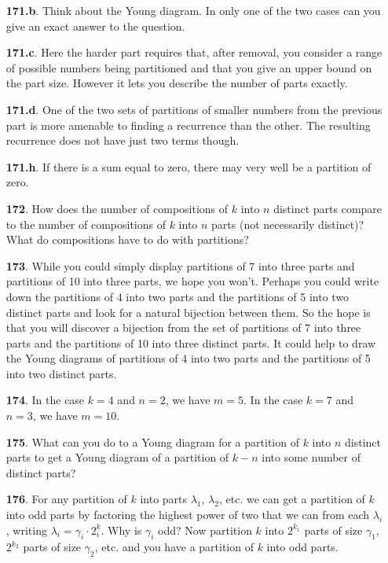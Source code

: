 \documentclass[10pt,]{book}
\theoremstyle{plain}
\theoremstyle{definition}
\theoremstyle{definition}
\numberwithin{equation}{chapter}
\begin{document}
\begin{itemize}[itemsep=1em]
\item[\textbf{171.b}.]Think about the Young diagram. In only one of the two cases can you give an exact answer to the question.%

\item[\textbf{171.c}.]Here the harder part requires that, after removal, you consider a range of possible numbers being partitioned and that you give an upper bound on the part size. However it lets you describe the number of parts exactly.%

\item[\textbf{171.d}.]One of the two sets of partitions of smaller numbers from the previous part is more amenable to finding a recurrence than the other. The resulting recurrence does not have just two terms though.%

\item[\textbf{171.h}.]If there is a sum equal to zero, there may very well be a partition of zero.%

\item[\textbf{172}.]How does the number of compositions of \(k\) into \(n\) distinct parts compare to the number of compositions of \(k\) into \(n\) parts (not necessarily distinct)? What do compositions have to do with partitions?%

\item[\textbf{173}.]While you could simply display partitions of 7 into three parts and partitions of 10 into three parts, we hope you won't. Perhaps you could write down the partitions of 4 into two parts and the partitions of 5 into two distinct parts and look for a natural bijection between them. So the hope is that you will discover a bijection from the set of partitions of 7 into three parts and the partitions of 10 into three distinct parts. It could help to draw the Young diagrams of partitions of 4 into two parts and the partitions of 5 into two distinct parts.%

\item[\textbf{174}.]In the case \(k=4\) and \(n=2\), we have \(m=5\). In the case \(k = 7\) and \(n = 3\), we have \(m = 10\).%

\item[\textbf{175}.]What can you do to a Young diagram for a partition of \(k\) into \(n\) distinct parts to get a Young diagram of a partition of \(k-n\) into some number of distinct parts?%

\item[\textbf{176}.]For any partition of \(k\) into parts \(\lambda_1\), \(\lambda_2\), etc. we can get a partition of \(k\) into odd parts by factoring the highest power of two that we can from each \(\lambda_i\), writing \(\lambda_i = \gamma_i\cdot 2^k_i\).  Why is \(\gamma_i\) odd? Now partition \(k\) into \(2^{k_1}\) parts of size \(\gamma_1\), \(2^{k_2}\) parts of size \(\gamma_2\), etc. and you have a partition of \(k\) into odd parts.%


\end{itemize}
\end{document}
